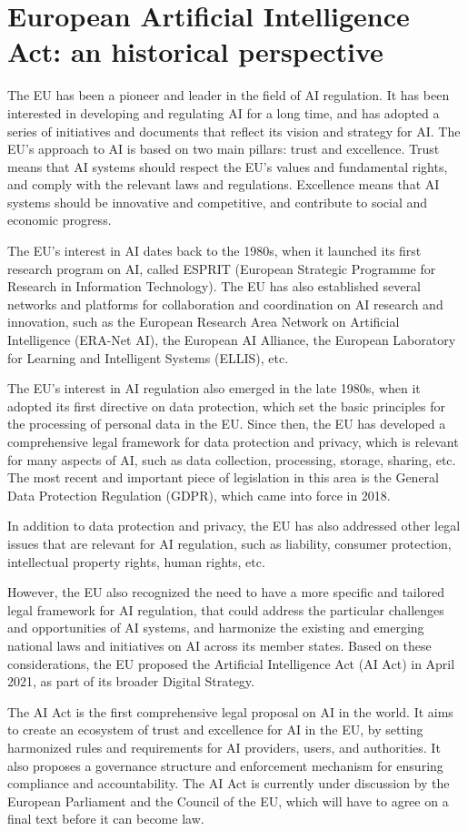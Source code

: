 \section{European Artificial Intelligence Act: an historical perspective}
The EU has been a pioneer and leader in the field of AI regulation. 
It has been interested in developing and regulating AI for a long time, and has adopted a series of initiatives and documents that reflect its vision and strategy for AI. 
The EU’s approach to AI is based on two main pillars: trust and excellence. 
Trust means that AI systems should respect the EU’s values and fundamental rights, and comply with the relevant laws and regulations.
Excellence means that AI systems should be innovative and competitive, and contribute to social and economic progress.

The EU’s interest in AI dates back to the 1980s, when it launched its first research program on AI, called ESPRIT (European Strategic Programme for Research in Information Technology). 
The EU has also established several networks and platforms for collaboration and coordination on AI research and innovation, such as the European Research Area Network on Artificial Intelligence (ERA-Net AI), the European AI Alliance, the European Laboratory for Learning and Intelligent Systems (ELLIS), etc.

The EU’s interest in AI regulation also emerged in the late 1980s, when it adopted its first directive on data protection, which set the basic principles for the processing of personal data in the EU. 
Since then, the EU has developed a comprehensive legal framework for data protection and privacy, which is relevant for many aspects of AI, such as data collection, processing, storage, sharing, etc.
The most recent and important piece of legislation in this area is the General Data Protection Regulation (GDPR), which came into force in 2018. 

In addition to data protection and privacy, the EU has also addressed other legal issues that are relevant for AI regulation, such as liability, consumer protection, intellectual property rights, human rights, etc.

However, the EU also recognized the need to have a more specific and tailored legal framework for AI regulation, that could address the particular challenges and opportunities of AI systems, and harmonize the existing and emerging national laws and initiatives on AI across its member states. 
Based on these considerations, the EU proposed the Artificial Intelligence Act (AI Act) in April 2021, as part of its broader Digital Strategy. 

The AI Act is the first comprehensive legal proposal on AI in the world.
It aims to create an ecosystem of trust and excellence for AI in the EU, by setting harmonized rules and requirements for AI providers, users, and authorities. 
It also proposes a governance structure and enforcement mechanism for ensuring compliance and accountability. 
The AI Act is currently under discussion by the European Parliament and the Council of the EU, which will have to agree on a final text before it can become law.
